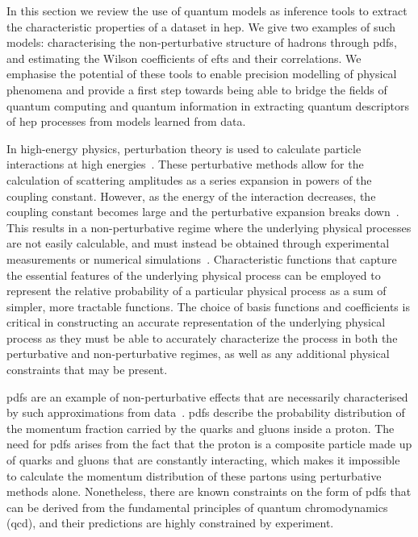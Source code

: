  In this section we review the use of quantum models as inference tools to extract the characteristic properties of a dataset in \gls{hep}. We give two examples of such models: characterising the non-perturbative structure of hadrons through \gls{pdfs}, and estimating the Wilson coefficients of \gls{efts} and their correlations. We emphasise the potential of these tools to enable precision modelling of physical phenomena and provide a first step towards being able to bridge the fields of quantum computing and quantum information in extracting quantum descriptors of \gls{hep} processes from models learned from data. 

In high-energy physics, perturbation theory is used to calculate particle interactions at high energies~\cite{Gross:1973id}. These perturbative methods allow for the calculation of scattering amplitudes as a series expansion in powers of the coupling constant. However, as the energy of the interaction decreases, the coupling constant becomes large and the perturbative expansion breaks down~\cite{Gross:1973ju}. This results in a non-perturbative regime where the underlying physical processes are not easily calculable, and must instead be obtained through experimental measurements or numerical simulations~\cite{Shifman:1978bx}. Characteristic functions that capture the essential features of the underlying physical process can be employed to represent the relative probability of a particular physical process as a sum of simpler, more tractable functions. The choice of basis functions and coefficients is critical in constructing an accurate representation of the underlying physical process as they must be able to accurately characterize the process in both the perturbative and non-perturbative regimes, as well as any additional physical constraints that may be present. 

\gls{pdfs} are an example of non-perturbative effects that are necessarily characterised by such approximations from data~\cite{collins_2011}. \gls{pdfs} describe the probability distribution of the momentum fraction carried by the quarks and gluons inside a proton. The need for \gls{pdfs} arises from the fact that the proton is a composite particle made up of quarks and gluons that are constantly interacting, which makes it impossible to calculate the momentum distribution of these partons using perturbative methods alone. Nonetheless, there are known constraints on the form of \gls{pdfs} that can be derived from the fundamental principles of quantum chromodynamics (\gls{qcd}), and their predictions are highly constrained by experiment.

